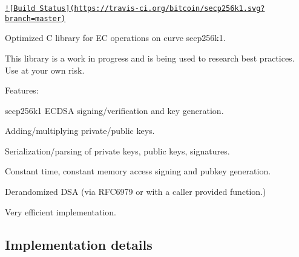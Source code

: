 \href{https://travis-ci.org/bitcoin/secp256k1}{\tt !\mbox{[}Build Status\mbox{]}(https\+://travis-\/ci.\+org/bitcoin/secp256k1.\+svg?branch=master)}

Optimized C library for E\+C operations on curve secp256k1.

This library is a work in progress and is being used to research best practices. Use at your own risk.

Features\+:
\begin{DoxyItemize}
\item secp256k1 E\+C\+D\+S\+A signing/verification and key generation.
\item Adding/multiplying private/public keys.
\item Serialization/parsing of private keys, public keys, signatures.
\item Constant time, constant memory access signing and pubkey generation.
\item Derandomized D\+S\+A (via R\+F\+C6979 or with a caller provided function.)
\item Very efficient implementation.
\end{DoxyItemize}

\subsection*{Implementation details }


